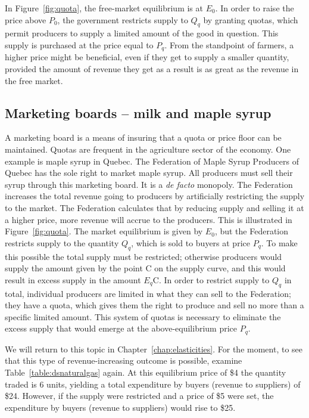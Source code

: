 In Figure~\ref{fig:quota}, the free-market equilibrium is at $E_0$. In
order to raise the price above $P_0$, the government restricts supply to $Q_q$
by granting quotas, which permit producers to supply a limited amount
of the good in question. This supply is purchased at the price equal to $P_q$.
From the standpoint of farmers, a higher price might be beneficial,
even if they get to supply a smaller quantity, provided the amount of
revenue they get as a result is as great as the revenue in the free market.



\newhtmlpage

\subsection*{Marketing boards -- milk and maple syrup}

A marketing board is a means of insuring that a quota or price floor can be
maintained. Quotas are frequent in the agriculture sector of the economy.
One example is maple syrup in Quebec. The Federation of Maple Syrup Producers
of Quebec has the sole right to market maple syrup. All producers must sell
their syrup through this marketing board. It is a \textit{de facto} monopoly. The
Federation increases the total revenue going to producers by artificially
restricting the supply to the market. The Federation calculates that by
reducing supply and selling it at a higher price, more revenue will accrue
to the producers. This is illustrated in Figure~\ref{fig:quota}. The market
equilibrium is given by $E_0$, but the Federation restricts supply to the
quantity $Q_q$, which is sold to buyers at price $P_q$. To make this possible
the total supply must be restricted; otherwise producers would supply the amount
given by the point C on the supply curve, and this would result in excess
supply in the amount $E_q$C. In order to restrict supply to $Q_q$ in total,
individual producers are limited in what they can sell to the Federation;
they have a quota, which gives them the right to produce and sell no more than
a specific limited amount. This system of quotas is necessary to eliminate
the excess supply that would emerge at the above-equilibrium price $P_q$.

We will return to this topic in Chapter~\ref{chap:elasticities}. For the moment,
to see that this type of revenue-increasing outcome is possible, examine
Table~\ref{table:dsnaturalgas} again. At this equilibrium price of \$4 the
quantity traded is 6 units, yielding a total expenditure by buyers (revenue
to suppliers) of \$24. However, if the supply were restricted and a price
of \$5 were set, the expenditure by buyers (revenue to suppliers) would
rise to \$25.
